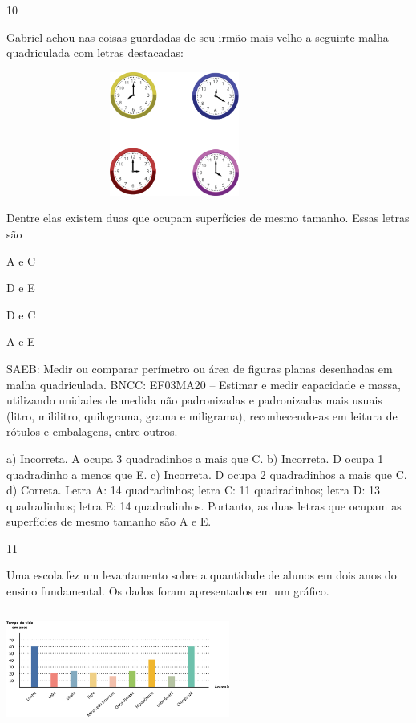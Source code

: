 \begin{escolha}
{\begin{escolha}
{\num{10}

Gabriel achou nas coisas guardadas de seu irmão mais velho a seguinte malha quadriculada com letras destacadas:


\includegraphics[width=4.36538in,height=1.60417in]{media/image111.png}

Dentre elas existem duas que ocupam superfícies de mesmo tamanho. Essas letras são

\begin{escolha}
\item
  A e C
\item
  D e E
\item
  D e C
\item
  A e E
\end{escolha}

SAEB: Medir ou comparar perímetro ou área de figuras planas
desenhadas em malha quadriculada.
BNCC: EF03MA20 -- Estimar e medir capacidade e massa, utilizando unidades de medida não
padronizadas e padronizadas mais usuais (litro, mililitro, quilograma, grama e miligrama),
reconhecendo-as em leitura de rótulos e embalagens, entre outros.

a) Incorreta. A ocupa 3 quadradinhos a mais que C.
b) Incorreta. D ocupa 1 quadradinho a menos que E.
c) Incorreta. D ocupa 2 quadradinhos a mais que C.
d) Correta. Letra A: 14 quadradinhos; letra C: 11 quadradinhos; letra D: 13 quadradinhos; letra E: 14 quadradinhos. Portanto, as duas letras que ocupam as superfícies de mesmo tamanho são A e E.

\num{11}

Uma escola fez um levantamento sobre a quantidade de alunos em dois anos
do ensino fundamental. Os dados foram apresentados em um gráfico.


\includegraphics[width=2.89744in,height=1.52156in]{media/image112.png}

}
\end{escolha}}
\end{escolha}
